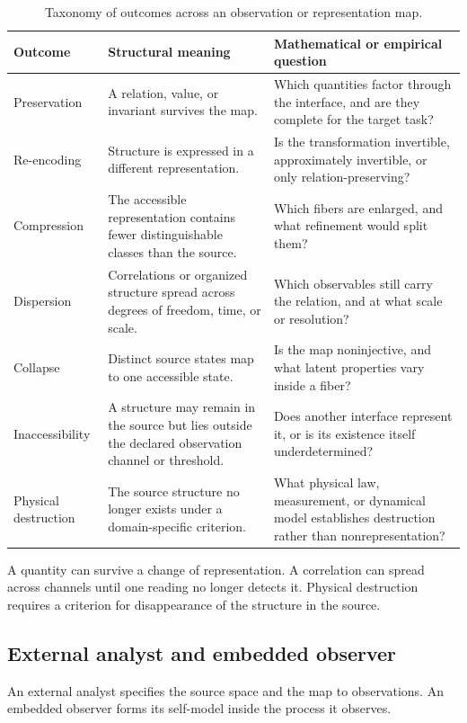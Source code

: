 \begin{table}[tbp]
\centering
\caption{Taxonomy of outcomes across an observation or representation map.}
\begin{tabularx}{\textwidth}{@{}p{}X X@{}}
\toprule
Outcome & Structural meaning & Mathematical or empirical question \\
\midrule
Preservation & A relation, value, or invariant survives the map. & Which quantities factor through the interface, and are they complete for the target task? \\
Re-encoding & Structure is expressed in a different representation. & Is the transformation invertible, approximately invertible, or only relation-preserving? \\
Compression & The accessible representation contains fewer distinguishable classes than the source. & Which fibers are enlarged, and what refinement would split them? \\
Dispersion & Correlations or organized structure spread across degrees of freedom, time, or scale. & Which observables still carry the relation, and at what scale or resolution? \\
Collapse & Distinct source states map to one accessible state. & Is the map noninjective, and what latent properties vary inside a fiber? \\
Inaccessibility & A structure may remain in the source but lies outside the declared observation channel or threshold. & Does another interface represent it, or is its existence itself underdetermined? \\
Physical destruction & The source structure no longer exists under a domain-specific criterion. & What physical law, measurement, or dynamical model establishes destruction rather than nonrepresentation? \\
\bottomrule
\end{tabularx}
\label{tab:mappingtaxonomy}
\end{table}

A quantity can survive a change of representation. A correlation can spread across channels until one reading no longer detects it. Physical destruction requires a criterion for disappearance of the structure in the source.

\subsection{External analyst and embedded observer}

An external analyst specifies the source space and the map to observations. An embedded observer forms its self-model inside the process it observes.

